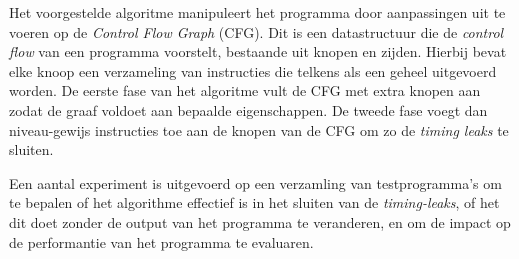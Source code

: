 \documentclass[master=cws,masteroption=ai, english]{kulemt}
\begin{document}
\begin{abstract*}
Het voorgestelde algoritme manipuleert het programma door aanpassingen uit te voeren op de \textit{Control Flow Graph} (CFG). 
Dit is een datastructuur die de \textit{control flow} van een programma voorstelt, bestaande uit knopen en zijden. Hierbij bevat elke knoop een verzameling van instructies die telkens 
als een geheel uitgevoerd worden. De eerste fase van het algoritme vult de CFG met extra knopen aan zodat de graaf voldoet aan bepaalde eigenschappen. 
De tweede fase voegt dan niveau-gewijs instructies toe aan de knopen van de CFG om zo de \textit{timing leaks} te sluiten. 


Een aantal experiment is uitgevoerd op een verzamling van testprogramma's om te bepalen of het algorithme effectief is in het sluiten van de \textit{timing-leaks}, of het dit doet 
zonder de output van het programma te veranderen, en om de impact op de performantie van het programma te evaluaren. 

\end{abstract*}


\listoffiguresandtables


\mainmatter 









\backmatter 



\end{document}
